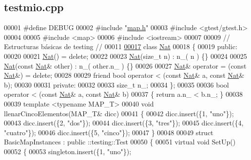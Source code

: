 \hypertarget{testmio_8cpp_source}{}\subsection{testmio.\+cpp}

\begin{DoxyCode}
00001 \textcolor{preprocessor}{#define DEBUG}
00002 \textcolor{preprocessor}{#include "\hyperlink{map_8h}{map.h}"}
00003 \textcolor{preprocessor}{#include <gtest/gtest.h>}
00004 
00005 \textcolor{preprocessor}{#include <map>}
00006 \textcolor{preprocessor}{#include <iostream>}
00007 
00009 \textcolor{comment}{// Estructuras básicas de testing //}
00011 \textcolor{comment}{}
\hypertarget{testmio_8cpp_source.tex_l00017}{}\hyperlink{classNat}{00017} \textcolor{keyword}{class }\hyperlink{classNat}{Nat}
00018 \{
00019     \textcolor{keyword}{public}:
00020 
00021         \hyperlink{classNat}{Nat}() = \textcolor{keyword}{delete};
00022 
00023         \hyperlink{classNat}{Nat}(\textcolor{keywordtype}{size\_t} n) : n\_( n ) \{\}
00024 
00025         \hyperlink{classNat}{Nat}(\textcolor{keyword}{const} \hyperlink{classNat}{Nat}& other) : n\_( other.n\_ ) \{\}
00026 
00027         \hyperlink{classNat}{Nat}& operator = (\textcolor{keyword}{const} \hyperlink{classNat}{Nat}&) = \textcolor{keyword}{delete};
00028 
00029         \textcolor{keyword}{friend} \textcolor{keywordtype}{bool} operator < (\textcolor{keyword}{const} \hyperlink{classNat}{Nat}& a, \textcolor{keyword}{const} \hyperlink{classNat}{Nat}& b);
00030 
00031     \textcolor{keyword}{private}:
00032 
00033         \textcolor{keywordtype}{size\_t} n\_;
00034 \};
00035 
00036 \textcolor{keywordtype}{bool} operator < (\textcolor{keyword}{const} \hyperlink{classNat}{Nat}& a, \textcolor{keyword}{const} \hyperlink{classNat}{Nat}& b)
00037 \{ \textcolor{keywordflow}{return} a.n\_ < b.n\_; \}
00038 
00039 \textcolor{keyword}{template} <\textcolor{keyword}{typename} MAP\_T>
00040 \textcolor{keywordtype}{void} llenarCincoElementos(MAP\_T& dicc)
00041 \{
00042     dicc.insert(\{1, \textcolor{stringliteral}{"uno"}\});
00043     dicc.insert(\{2, \textcolor{stringliteral}{"dos"}\});
00044     dicc.insert(\{3, \textcolor{stringliteral}{"tres"}\});
00045     dicc.insert(\{4, \textcolor{stringliteral}{"cuatro"}\});
00046     dicc.insert(\{5, \textcolor{stringliteral}{"cinco"}\});
00047 \}
00048 
00049 \textcolor{keyword}{struct }BasicMapInstances : \textcolor{keyword}{public} ::testing::Test
00050 \{
00051     \textcolor{keyword}{virtual} \textcolor{keywordtype}{void} SetUp()
00052     \{
00053         singleton.insert(\{1, \textcolor{stringliteral}{"uno"}\});

\end{DoxyCode}
